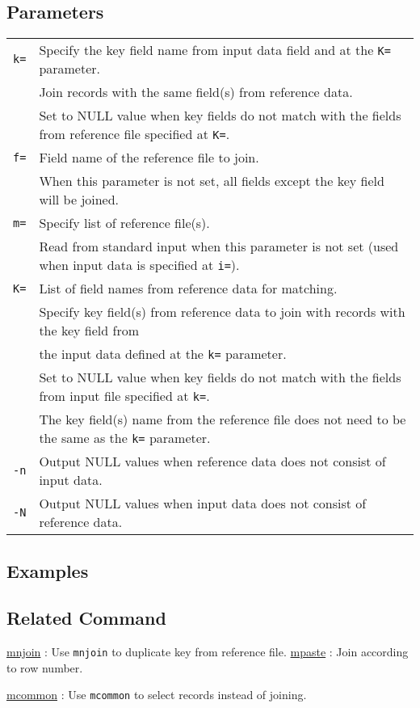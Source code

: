 \subsection*{Parameters}
\begin{table}[htbp]
{\small
\begin{tabular}{ll}
\verb|k=|    & Specify the key field name from input data field and at the \verb|K=| parameter. \\
             & Join records with the same field(s) from reference data.  \\
             & Set to NULL value when key fields do not match with the fields from reference file specified at \verb|K=|. \\
\verb|f=|    & Field name of the reference file to join.\\
             & When this parameter is not set, all fields except the key field will be joined. \\
\verb|m=|    & Specify list of reference file(s). \\
             & Read from standard input when this parameter is not set (used when input data is specified at \verb|i=|).\\
\verb|K=|    & List of field names from reference data for matching.\\
             & Specify key field(s) from reference data to join with records with the key field from \\
             &  the input data defined at the \verb|k=| parameter. \\
             & Set to NULL value when key fields do not match with the fields from input file specified at \verb|k=|.\\
             & The key field(s) name from the reference file does not need to be the same as the \verb|k=| parameter.  \\
\verb|-n|    & Output NULL values when reference data does not consist of input data. \\
\verb|-N|    & Output NULL values when input data does not consist of reference data.\\
\end{tabular} 
}
\end{table} 

\subsection*{Examples}


\subsection*{Related Command}
\hyperref[sect:mnjoin]{mnjoin} : Use \verb|mnjoin| to duplicate key from reference file.  
\hyperref[sect:mpaste]{mpaste} :  Join according to row number. 

\hyperref[sect:mcommon]{mcommon} : Use \verb|mcommon| to select records instead of joining. 

%
